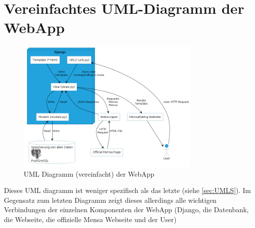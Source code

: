 \section{Vereinfachtes UML-Diagramm der WebApp} \label{sec:UMLG}
\begin{figure}[ht]
    \centering
    \includegraphics[width=0.8\textwidth]{images/UML-General.png}
    \caption{UML Diagramm (vereinfacht) der WebApp}
    \label{fig:DB}
\end{figure}

Dieses UML diagramm ist weniger spezifisch als das letzte (siehe
\ref{sec:UMLS}). Im Gegensatz zum letzten Diagramm zeigt dieses allerdings alle
wichtigen Verbindungen der einzelnen Komponenten der WebApp (Django, die
Datenbank, die Webseite, die offizielle Mensa Webseite und der User)


